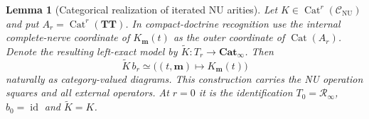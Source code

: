 \documentclass[oneside]{article}
\theoremstyle{plain}
\newtheorem{lemma}[theorem]{Lemma}
\theoremstyle{definition}
\theoremstyle{remark}
\newcommand{\CNU}{\mathcal C_{\mathrm{NU}}}
\newcommand{\Cat}{\mathbf{Cat}_{\infty}}
\newcommand{\RNU}{\mathcal R_{\infty}}
\newcommand{\TT}{\mathbf{TT}}
\newcommand{\id}{\operatorname{id}}
\begin{document}
\begin{lemma}[Categorical realization of iterated NU arities]
\label{lem:stratified-categorical-arity-realization}
Let $K\in\operatorname{Cat}^r(\CNU)$ and put
$A_r=\operatorname{Cat}^r(\TT)$. In compact-doctrine recognition
use the internal complete-nerve coordinate of $K_{\mathbf m}(t)$
as the outer coordinate of $\operatorname{Cat}(A_r)$.
Denote the resulting left-exact model by
$\widetilde K:T_r\to\Cat$. Then
\begin{equation}\label{eq:stratified-categorical-arity-realization}
 \widetilde K\,b_r\simeq
 \bigl((t,\mathbf m)\longmapsto K_{\mathbf m}(t)\bigr)
\end{equation}
naturally as category-valued diagrams. This construction carries the
NU operation squares and all external operators. At $r=0$ it is the
identification $T_0=\RNU$, $b_0=\id$ and $\widetilde K=K$.
\end{lemma}
\end{document}
